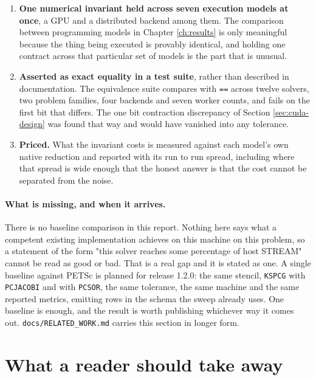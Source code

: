 \begin{enumerate}
  \item \textbf{One numerical invariant held across seven execution models at
        once}, a GPU and a distributed backend among them. The comparison
        between programming models in Chapter \ref{ch:results} is only
        meaningful because the thing being executed is provably identical, and
        holding one contract across that particular set of models is the part
        that is unusual.
  \item \textbf{Asserted as exact equality in a test suite}, rather than
        described in documentation. The equivalence suite compares with
        \texttt{==} across twelve solvers, two problem families, four backends
        and seven worker counts, and fails on the first bit that differs. The
        one bit contraction discrepancy of Section \ref{sec:cuda-design} was
        found that way and would have vanished into any tolerance.
  \item \textbf{Priced.} What the invariant costs is measured against each
        model's own native reduction and reported with its run to run spread,
        including where that spread is wide enough that the honest answer is
        that the cost cannot be separated from the noise.
\end{enumerate}

\paragraph{What is missing, and when it arrives.} There is no baseline
comparison in this report. Nothing here says what a competent existing
implementation achieves on this machine on this problem, so a statement of the
form "this solver reaches some percentage of host STREAM" cannot be read as good
or bad. That is a real gap and it is stated as one. A single baseline against
PETSc is planned for release 1.2.0: the same stencil, \texttt{KSPCG} with
\texttt{PCJACOBI} and with \texttt{PCSOR}, the same tolerance, the same machine
and the same reported metrics, emitting rows in the schema the sweep already
uses. One baseline is enough, and the result is worth publishing whichever way
it comes out. \texttt{docs/RELATED\_WORK.md} carries this section in longer form.

\section{What a reader should take away}

